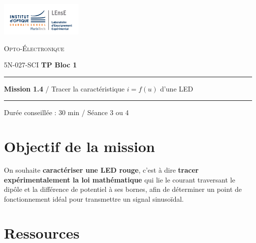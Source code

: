 
\newpage
\pagestyle{empty}

\begin{minipage}[c]{.25\linewidth}
	\includegraphics[width=4cm]{images/Logo-LEnsE.png}
\end{minipage} \hfill
\begin{minipage}[c]{.4\linewidth}

\begin{center}
\vspace{0.3cm}
{\Large \textsc{Opto-Électronique}}

\medskip

5N-027-SCI \qquad \textbf{\Large TP Bloc 1}

\end{center}
\end{minipage}\hfill

\vspace{0.5cm}

\noindent \rule{\linewidth}{1pt}

{\noindent\Large \rule[-7pt]{0pt}{30pt}  \textbf{Mission 1.4} / Tracer la caractéristique $i = f(u)$ d'une LED} 

\noindent \rule{\linewidth}{1pt}

\vspace{-0.5cm}

\begin{center}

Durée conseillée : 30 min / Séance 3 ou 4

\end{center}

\section{Objectif de la mission}
\label{mission14}

On souhaite \textbf{caractériser une LED rouge}, c'est à dire \textbf{tracer expérimentalement la loi mathématique} qui lie le courant traversant le dipôle et la différence de potentiel à ses bornes, afin de déterminer un point de fonctionnement idéal pour transmettre un signal sinusoïdal.


\section{Ressources}

